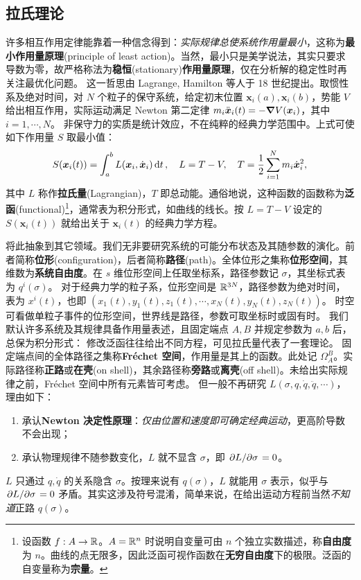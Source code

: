 \subsection{拉氏理论}

许多相互作用定律能靠着一种信念得到：\textit{实际规律总使系统作用量最小}，这称为\textbf{最小作用量原理}(principle of least action)。当然，最小只是美学说法，其实只要求导数为零，故严格称法为\textbf{稳恒}(stationary)\textbf{作用量原理}，仅在分析解的稳定性时再关注最优化问题。
这一哲思由 Lagrange, Hamilton 等人于 18 世纪提出。取惯性系及绝对时间，对 $N$ 个粒子的保守系统，给定初末位置 $\bm x_i(a),\bm x_i(b)$，势能 $V$ 给出相互作用，实际运动满足 Newton 第二定律 $m_i\ddot{\vb* x}_i(t)=-\grad V(\vb* x_i)$，其中 $i=1,\cdots,N$。
非保守力的实质是统计效应，不在纯粹的经典力学范围中。上式可使如下作用量 $S$ 取最小值：
\[S(\vb* x_i(t))=\int_{a}^{b}L(\vb* x_i,\dot{\vb* x}_i)\dd{t},\quad L=T-V,\quad T=\frac{1}{2}\sum_{i=1}^N m_i \dot{\vb* x}_i^2,\]
其中 $L$ 称作\textbf{拉氏量}(Lagrangian)，$T$ 即总动能。通俗地说，这种函数的函数称为\textbf{泛函}(functional)\footnote{设函数 $f:A\to\mathbb{R}$。$A=\mathbb{R}^n$ 时说明自变量可由 $n$ 个独立实数描述，称\textbf{自由度}为 $n$。曲线的点无限多，因此泛函可视作函数在\textbf{无穷自由度}下的极限。泛函的自变量称为\textbf{宗量}。}，通常表为积分形式，如曲线的线长。按 $L=T-V$ 设定的 $S(\bm x_i(t))$ 就给出关于 $\bm x_i(t)$ 的经典力学方程。

将此抽象到其它领域。我们无非要研究系统的可能分布状态及其随参数的演化。前者简称\textbf{位形}(configuration)，后者简称\textbf{路径}(path)。全体位形之集称\textbf{位形空间}，其维数为\textbf{系统自由度}。在 $s$ 维位形空间上任取坐标系，路径参数记 $\sigma$，其坐标式表为 $q^i(\sigma)$。
对于经典力学的粒子系，位形空间是 $\mathbb{R}^{3N}$，路径参数为绝对时间，表为 $x^i(t)$，也即 $(x_1(t),y_1(t),z_1(t),\cdots,x_N(t),y_N(t),z_N(t))$。
时空可看做单粒子事件的位形空间，世界线是路径，参数可取坐标时或固有时。
我们默认许多系统及其规律具备作用量表述，且固定端点 $A,B$ 并规定参数为 $a,b$ 后，总保为积分形式：
修改泛函往往给出不同方程，可见拉氏量代表了一套理论。
固定端点间的全体路径之集称\textbf{Fréchet 空间}，作用量是其上的函数。此处记 $\Omega_A^B$。实际路径称\textbf{正路}或\textbf{在壳}(on shell)，其余路径称\textbf{旁路}或\textbf{离壳}(off shell)。未给出实际规律之前，Fréchet 空间中所有元素皆可考虑。
但一般不再研究 $L(\sigma,q,\dot q,\ddot q,\cdots)$，理由如下：
\begin{enumerate}
    \item 承认\textbf{Newton 决定性原理}：\textit{仅由位置和速度即可确定经典运动}，更高阶导数不会出现；
    \item 承认物理规律不随参数变化，$L$ 就不显含 $\sigma$，即 $\pdv*{L}{\sigma}=0$。
\end{enumerate}
$L$ 只通过 $q,\dot q$ 的关系隐含 $\sigma$。按理来说有 $q(\sigma)$，$L$ 就能用 $\sigma$ 表示，似乎与 $\pdv*{L}{\sigma}=0$ 矛盾。其实这涉及符号混淆，简单来说，在给出运动方程前当然\textit{不知道}正路 $q(\sigma)$。

